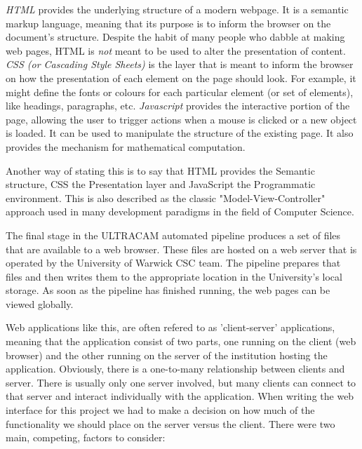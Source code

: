 \emph{HTML} provides the underlying structure of a modern webpage. It is a semantic markup language, meaning that its purpose is to inform the browser on the document's structure. Despite the habit of many people who dabble at making web pages, HTML is \emph{not} meant to be used to alter the presentation of content. \emph{CSS (or Cascading Style Sheets)} is the layer that is meant to inform the browser on how the presentation of each element on the page should look. For example, it might define the fonts or colours for each particular element (or set of elements), like headings, paragraphs, etc. \emph{Javascript} provides the interactive portion of the page, allowing the user to trigger actions when a mouse is clicked or a new object is loaded. It can be used to manipulate the structure of the existing page. It also provides the mechanism for mathematical computation.

Another way of stating this is to say that HTML provides the Semantic structure, CSS the Presentation layer and JavaScript the Programmatic environment. This is also described as the classic "Model-View-Controller" approach used in many development paradigms in the field of Computer Science.

The final stage in the ULTRACAM automated pipeline produces a set of files that are available to a web browser. These files are hosted on a web server that is operated by the University of Warwick CSC team. The pipeline prepares that files and then writes them to the appropriate location in the University's local storage. As soon as the pipeline has finished running, the web pages can be viewed globally. 

Web applications like this, are often refered to as 'client-server' applications, meaning that the application consist of two parts, one running on the client (web browser) and the other running on the server of the institution hosting the application. Obviously, there is a one-to-many relationship between clients and server. There is usually only one server involved, but many clients can connect to that server and interact individually with the application. When writing the web interface for this project we had to make a decision on how much of the functionality we should place on the server versus the client. There were two main, competing, factors to consider:

